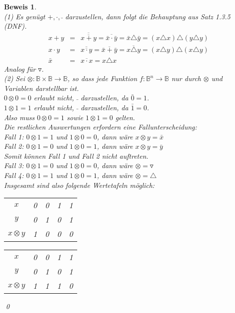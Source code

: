 \documentclass[ngerman]{scrartcl}
\theoremstyle{custom}
\newtheorem*{bw}{Beweis}
\newcommand{\0}{\mathbf{0}}
\newcommand{\1}{\mathbf{L}}
\begin{document}
\begin{bw} ~\\
(1) Es gen\"ugt $+, \cdot, \bar~$ darzustellen, dann folgt die
Behauptung aus Satz 1.3.5 (DNF).
\begin{eqnarray}
x+y &=& \overline{\overline{x + y}} = \overline{\bar x \cdot \bar y} =
\bar x \triangle \bar y = (x \triangle x) \triangle (y \triangle y)\\
x \cdot y &=& \overline{\overline{x \cdot y}} = \overline{\bar x +
  \bar y} = \overline{x \triangle y} = (x \triangle y) \triangle (x
\triangle y)\\
\bar x &=& \overline{x \cdot x} = x \triangle x
\end{eqnarray}
Analog f\"ur $\triangledown$.\\
(2) Sei $\otimes: \mathds{B} \times \mathds{B} \rightarrow \mathds{B}$,
so dass jede Funktion $f: \mathds{B}^n \rightarrow \mathds{B}$ nur
durch $\otimes$ und Variablen darstellbar ist.\\
$0 \otimes 0 = 0$ erlaubt nicht, $\bar ~$ darzustellen, da $\bar 0 =
1$. \\
$1 \otimes 1 = 1$ erlaubt nicht, $\bar ~$ darzustellen, da $\bar 1
= 0$.\\
Also muss $0 \otimes 0 = 1$ sowie $1 \otimes 1 = 0$ gelten.\\

Die restlichen Auswertungen erfordern eine Fallunterscheidung:\\
Fall 1: $0 \otimes 1 = 1$ und $1 \otimes 0 = 0$, dann w\"are $x \otimes
y = \bar x$\\
Fall 2: $0 \otimes 1 = 0$ und $1 \otimes 0 = 1$, dann w\"are $x \otimes
y = \bar y$\\
Somit k\"onnen Fall 1 und Fall 2 nicht auftreten.\\

Fall 3: $0 \otimes 1 = 0$ und $1 \otimes 0 = 0$, dann w\"are $\otimes =
\triangledown$\\
Fall 4: $0 \otimes 1 = 1$ und $1 \otimes 0 = 1$, dann w\"are $\otimes
= \triangle$\\

Insgesamt sind also folgende Wertetafeln m\"oglich: \\
\begin{tabular}{c|cccc}
$x$ & 0 & 0 & 1 & 1 \\
$y$ & 0 & 1 & 0 & 1 \\
\hline $x \otimes y$ & 1 & 0 & 0 & 0
\end{tabular}
\begin{tabular}{c|cccc}
$x$ & 0 & 0 & 1 & 1 \\
$y$ & 0 & 1 & 0 & 1 \\
\hline $x \otimes y$ & 1 & 1 & 1 & 0
\end{tabular}
\qed
\end{bw}
\end{document}
